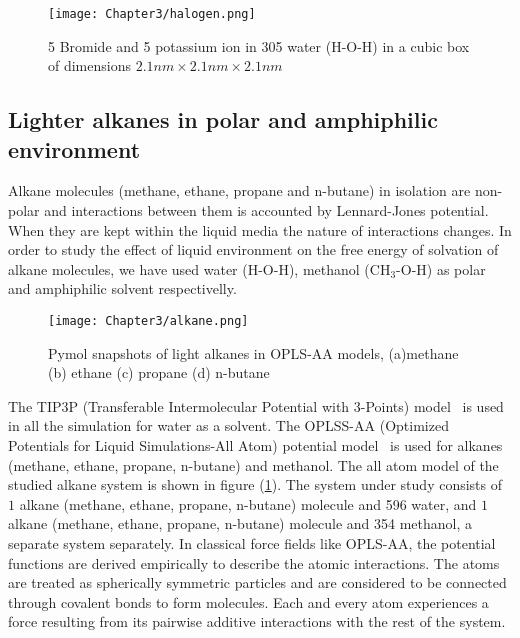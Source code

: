 \begin{figure}[h!]
\centering
\texttt{[image: Chapter3/halogen.png]}
\caption[ Bromide and potassium ion in water (H-O-H) in a cubic box.]{ 5 Bromide and 5 potassium ion in 305 water (H-O-H) in a cubic box of dimensions $2.1 nm \times 2.1 nm \times 2.1 nm$}
\end{figure}


\subsection{Lighter alkanes  in polar and amphiphilic environment }
\label{alkane_solvation}
Alkane molecules  (methane, ethane, propane and n-butane) in isolation  are non-polar and interactions between them is accounted by Lennard-Jones potential. When they are  kept within the liquid media the nature of interactions changes. In order to study the effect of liquid environment on the free energy of solvation of alkane molecules, we have used water (H-O-H), methanol (CH$_3$-O-H) as polar and amphiphilic  solvent respectivelly.

\begin{figure}[h!]
\centering
\texttt{[image: Chapter3/alkane.png]}
\caption[Pymol snapshots of light alkanes model; methane, ethane, propane and n-butane] {Pymol snapshots of light alkanes in OPLS-AA models, (a)methane (b) ethane (c) propane  (d) n-butane }
\label{alkaneimage}
\end{figure}
 
The TIP3P (Transferable Intermolecular Potential with 3-Points) model~\citep{jorgensen1983comparison}  is used in all the simulation for water as a solvent. The OPLSS-AA (Optimized Potentials for Liquid Simulations-All Atom) potential model~\citep{kaminski2001evaluation} is used for alkanes (methane, ethane, propane, n-butane) and methanol. The all atom model of the studied alkane system is shown in figure (\ref{alkaneimage}). The system under study consists of $1$ alkane (methane, ethane, propane, n-butane) molecule and 596 water, and $1$ alkane (methane, ethane, propane, n-butane) molecule and 354 methanol, a separate system  separately. In classical force fields like OPLS-AA, the potential functions are derived empirically to describe the atomic interactions. The atoms are treated as spherically symmetric particles and are considered to be connected through covalent bonds to form molecules. Each and every atom experiences a force resulting from its pairwise additive interactions with the rest of the system. 

